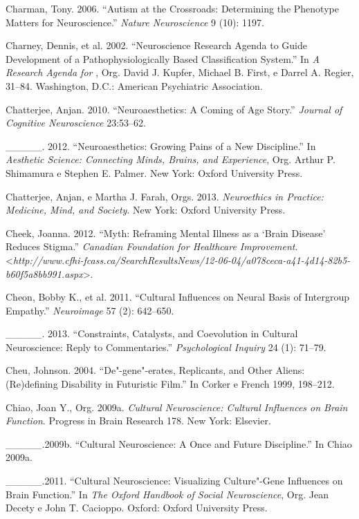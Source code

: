 {\begin{Parskip}
Charman, Tony. 2006. ``Autism at the Crossroads: Determining the
Phenotype Matters for Neuroscience.'' \emph{Nature Neuroscience} 9 (10):
1197.

Charney, Dennis, et al. 2002. ``Neuroscience Research Agenda to Guide
Development of a Pathophysiologically Based Classification System.'' In
\emph{A Research Agenda for }, Org. David J. Kupfer, Michael B.
First, e Darrel A. Regier, 31--84. Washington, D.C.: American
Psychiatric Association.

Chatterjee, Anjan. 2010. ``Neuroaesthetics: A Coming of Age Story.''
\emph{Journal of Cognitive Neuroscience} 23:53--62.

\_\_\_\_\_. 2012. ``Neuroaesthetics: Growing Pains of a New Discipline.''
In \emph{Aesthetic Science: Connecting Minds, Brains, and Experience},
Org. Arthur P. Shimamura e Stephen E. Palmer. New York: Oxford
University Press.

Chatterjee, Anjan, e Martha J. Farah, Orgs. 2013. \emph{Neuroethics in
Practice: Medicine, Mind, and Society}. New York: Oxford University
Press.

Cheek, Joanna. 2012. ``Myth: Reframing Mental Illness as a `Brain
Disease' Reduces Stigma.'' \emph{Canadian Foundation for Healthcare
Improvement}.
\textless{}\emph{http://www.cfhi-fcass.ca/SearchResultsNews/12-06-04/a078ceca-a41-4d14-82b5-b60f5a8bb991.aspx}\textgreater{}.

Cheon, Bobby K., et al. 2011. ``Cultural Influences on Neural Basis of
Intergroup Empathy.'' \emph{Neuroimage} 57 (2): 642--650.

\_\_\_\_\_. 2013. ``Constraints, Catalysts, and Coevolution in Cultural
Neuroscience: Reply to Commentaries.'' \emph{Psychological Inquiry} 24
(1): 71--79.

Cheu, Johnson. 2004. ``De"-gene"-erates, Replicants, and Other Aliens:
(Re)defining Disability in Futuristic Film.'' In Corker e French 1999,
198--212.

Chiao, Joan Y., Org. 2009a. \emph{Cultural Neuroscience: Cultural
Influences on Brain Function}. Progress in Brain Research 178. New York:
Elsevier.

\_\_\_\_\_.2009b. ``Cultural Neuroscience: A Once and Future
Discipline.'' In Chiao 2009a.

\_\_\_\_\_.2011. ``Cultural Neuroscience: Visualizing Culture"-Gene
Influences on Brain Function.'' In \emph{The Oxford Handbook of Social
Neuroscience}, Org. Jean Decety e John T. Cacioppo. Oxford: Oxford
University Press.


\end{Parskip}}
